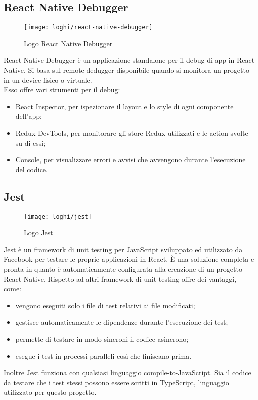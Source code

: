 \subsection{React Native Debugger}
\begin{figure}[H] 
	\centering
	\texttt{[image: loghi/react-native-debugger]}
	\caption{Logo React Native Debugger}
\end{figure}
React Native Debugger è un applicazione standalone per il debug di app in React 
Native. Si basa sul remote dedugger disponibile quando si monitora un progetto 
in un device fisico o virtuale.\\ Esso offre vari strumenti per il debug:
\begin{itemize}
	\item React Inspector, per ispezionare il layout e lo style di ogni componente dell'app;
	\item Redux DevTools, per monitorare gli store Redux utilizzati e le action svolte su di essi;
	\item Console, per visualizzare errori e avvisi che avvengono durante l'esecuzione del codice.
\end{itemize}

\subsection{Jest}
\begin{figure}[H] 
	\centering
	\texttt{[image: loghi/jest]}
	\caption{Logo Jest}
\end{figure}
Jest è un framework di unit testing per JavaScript sviluppato ed utilizzato da 
Facebook per testare le proprie applicazioni in React. È una soluzione completa 
e pronta in quanto è automaticamente configurata alla creazione di un progetto 
React Native.
Rispetto ad altri framework di unit testing offre dei vantaggi, come: 
\begin{itemize}
	\item vengono eseguiti solo i file di test relativi ai file modificati;
	\item gestisce automaticamente le dipendenze durante l'esecuzione dei test;
	\item permette di testare in modo sincroni il codice asincrono;
	\item esegue i test in processi paralleli così che finiscano prima.
\end{itemize}
Inoltre Jest funziona con qualsiasi linguaggio compile-to-JavaScript. 
Sia il codice da testare che i test stessi possono essere scritti in TypeScript, 
linguaggio utilizzato per questo progetto. 
